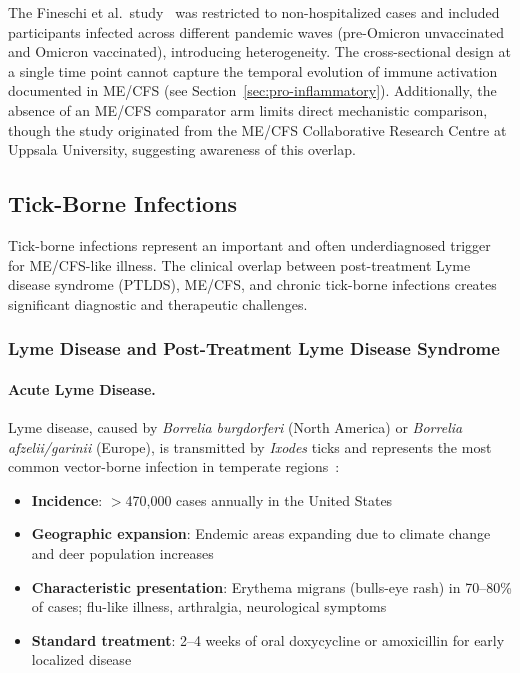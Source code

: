 \begin{limitation}
The Fineschi et al.\ study~\cite{Fineschi2026pasc_proteomics} was restricted to non-hospitalized cases and included participants infected across different pandemic waves (pre-Omicron unvaccinated and Omicron vaccinated), introducing heterogeneity. The cross-sectional design at a single time point cannot capture the temporal evolution of immune activation documented in ME/CFS (see Section~\ref{sec:pro-inflammatory}). Additionally, the absence of an ME/CFS comparator arm limits direct mechanistic comparison, though the study originated from the ME/CFS Collaborative Research Centre at Uppsala University, suggesting awareness of this overlap.
\end{limitation}

\subsection{Tick-Borne Infections}
\label{sec:tick-borne}

Tick-borne infections represent an important and often underdiagnosed trigger for ME/CFS-like illness. The clinical overlap between post-treatment Lyme disease syndrome (PTLDS), ME/CFS, and chronic tick-borne infections creates significant diagnostic and therapeutic challenges.

\subsubsection{Lyme Disease and Post-Treatment Lyme Disease Syndrome}

\paragraph{Acute Lyme Disease.}
Lyme disease, caused by \emph{Borrelia burgdorferi} (North America) or \emph{Borrelia afzelii/garinii} (Europe), is transmitted by \emph{Ixodes} ticks and represents the most common vector-borne infection in temperate regions~\cite{IDSALyme2020}:
\begin{itemize}
    \item \textbf{Incidence}: $>$470,000 cases annually in the United States~\cite{IDSALyme2020}
    \item \textbf{Geographic expansion}: Endemic areas expanding due to climate change and deer population increases
    \item \textbf{Characteristic presentation}: Erythema migrans (bulls-eye rash) in 70--80\% of cases; flu-like illness, arthralgia, neurological symptoms
    \item \textbf{Standard treatment}: 2--4 weeks of oral doxycycline or amoxicillin for early localized disease
\end{itemize}


